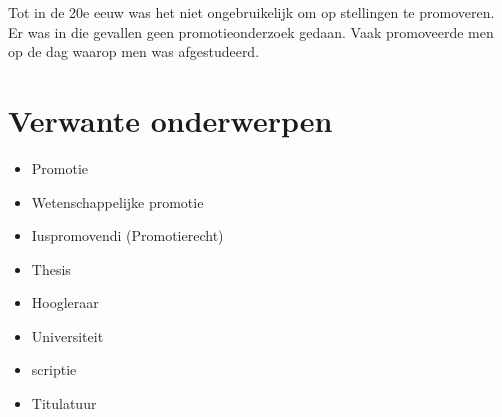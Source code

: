 Tot in de 20e eeuw was het niet ongebruikelijk om op stellingen te
promoveren. Er was in die gevallen geen promotieonderzoek gedaan. Vaak
promoveerde men op de dag waarop men was afgestudeerd.

\section{Verwante onderwerpen}
\label{sec:verwante-onderwerpen}

\begin{itemize}
\item Promotie~\cite{h2g2}
\item Wetenschappelijke promotie
\item Iuspromovendi (Promotierecht)
\item Thesis
\item Hoogleraar
\item Universiteit
\item scriptie\cite{pratchett06:_good_omens}
\item Titulatuur
\end{itemize}

\cite{palaz2015analysis}
\cite{BiLSTM}

